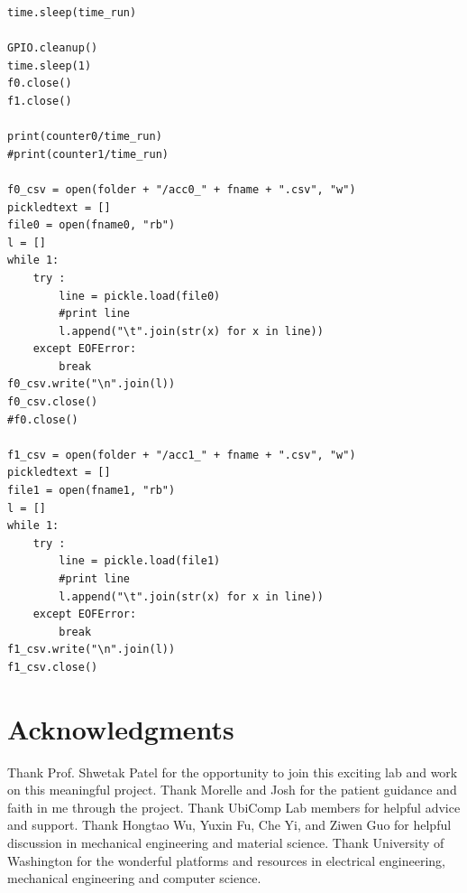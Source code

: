 \documentclass{sigchi}
\begin{document}
\begin{lstlisting}
time.sleep(time_run)

GPIO.cleanup()
time.sleep(1)
f0.close()
f1.close()

print(counter0/time_run)
#print(counter1/time_run)

f0_csv = open(folder + "/acc0_" + fname + ".csv", "w")
pickledtext = []
file0 = open(fname0, "rb")
l = []
while 1:
    try :
        line = pickle.load(file0)
        #print line
        l.append("\t".join(str(x) for x in line))
    except EOFError:
        break
f0_csv.write("\n".join(l))
f0_csv.close()
#f0.close()

f1_csv = open(folder + "/acc1_" + fname + ".csv", "w")
pickledtext = []
file1 = open(fname1, "rb")
l = []
while 1:
    try :
        line = pickle.load(file1)
        #print line
        l.append("\t".join(str(x) for x in line))
    except EOFError:
        break
f1_csv.write("\n".join(l))
f1_csv.close()
\end{lstlisting}

\section{Acknowledgments}

Thank Prof. Shwetak Patel for the opportunity to join this exciting lab and work on this meaningful project. Thank Morelle and Josh for the patient guidance and faith in me through the project. Thank UbiComp Lab members for helpful advice and support. Thank Hongtao Wu, Yuxin Fu, Che Yi, and Ziwen Guo for helpful discussion in mechanical engineering and material science. Thank University of Washington for the wonderful platforms and resources in electrical engineering, mechanical engineering and computer science. 

\balance{}




\end{document}

